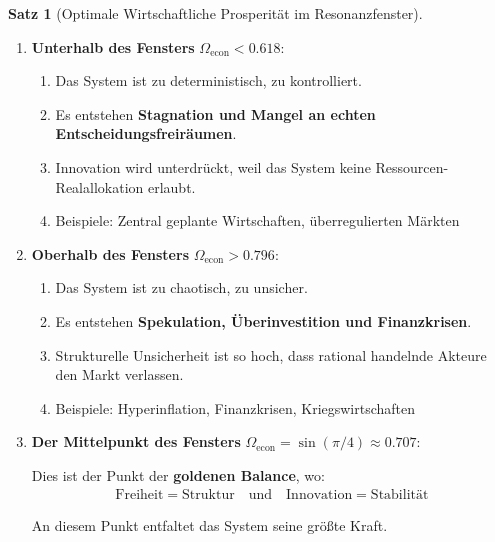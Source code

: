 \documentclass[a4paper, 12pt, twoside, openright]{report}
\theoremstyle{definition}
\theoremstyle{definition}
\newtheorem{satz}{Satz}[chapter]
\begin{document}
\begin{satz}[Optimale Wirtschaftliche Prosperität im Resonanzfenster]
\begin{enumerate}
	\item \textbf{Unterhalb des Fensters} $\Omega_{\text{econ}} < 0.618$:
	
	\begin{enumerate}
		\item Das System ist zu deterministisch, zu kontrolliert.
		\item Es entstehen \textbf{Stagnation und Mangel an echten Entscheidungsfreiräumen}.
		\item Innovation wird unterdrückt, weil das System keine Ressourcen-Realallokation erlaubt.
		\item Beispiele: Zentral geplante Wirtschaften, überregulierten Märkten
	\end{enumerate}
	
	\item \textbf{Oberhalb des Fensters} $\Omega_{\text{econ}} > 0.796$:
	
	\begin{enumerate}
		\item Das System ist zu chaotisch, zu unsicher.
		\item Es entstehen \textbf{Spekulation, Überinvestition und Finanzkrisen}.
		\item Strukturelle Unsicherheit ist so hoch, dass rational handelnde Akteure den Markt verlassen.
		\item Beispiele: Hyperinflation, Finanzkrisen, Kriegswirtschaften
	\end{enumerate}
	
	\item \textbf{Der Mittelpunkt des Fensters} $\Omega_{\text{econ}} = \sin(\pi/4) \approx 0.707$:
	
	Dies ist der Punkt der \textbf{goldenen Balance}, wo:
	\begin{align}
	\text{Freiheit} = \text{Struktur} \quad \text{und} \quad \text{Innovation} = \text{Stabilität}
	\end{align}
	
	An diesem Punkt entfaltet das System seine größte Kraft.
\end{enumerate}

\end{satz}
\end{document}
